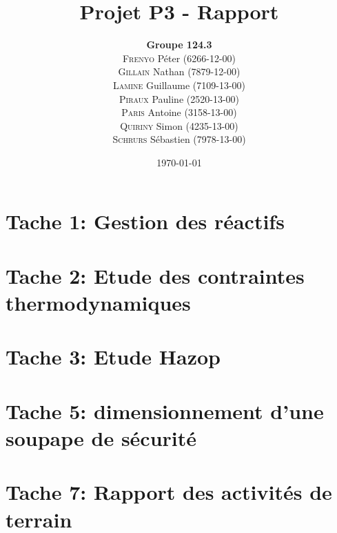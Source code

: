 \documentclass{report}
\title{Projet P3 - Rapport}
\author{\textbf{Groupe 124.3}\\
\textsc{Frenyo} Péter (6266-12-00)\\
\textsc{Gillain} Nathan (7879-12-00)\\
\textsc{Lamine} Guillaume (7109-13-00)\\
\textsc{Piraux} Pauline (2520-13-00)\\
\textsc{Paris} Antoine (3158-13-00)\\
\textsc{Quiriny} Simon (4235-13-00)\\
\textsc{Schrurs} Sébastien (7978-13-00)}
\date{\today}
\begin{document}
\maketitle
\tableofcontents

\chapter{Tache 1: Gestion des réactifs}

\chapter{Tache 2: Etude des contraintes thermodynamiques}

\chapter{Tache 3: Etude Hazop}

\chapter{Tache 5: dimensionnement d'une soupape de sécurité}

\chapter{Tache 7: Rapport des activités de terrain}




\nocite{*}
\end{document}
